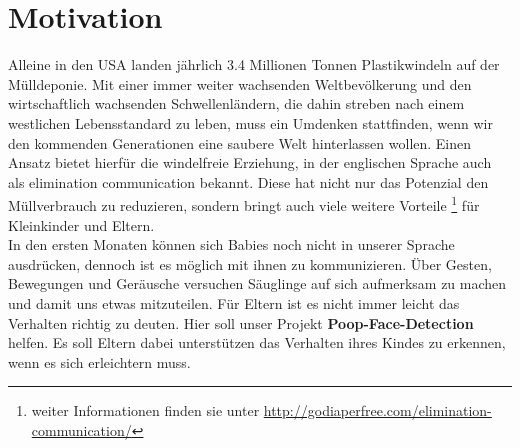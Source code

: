 \section{Motivation}
\label{sec:Motivation}
Alleine in den USA landen jährlich 3.4 Millionen Tonnen Plastikwindeln auf der Mülldeponie. Mit einer immer weiter wachsenden Weltbevölkerung und den wirtschaftlich wachsenden Schwellenländern, die dahin streben nach einem westlichen Lebensstandard zu leben,
muss ein Umdenken stattfinden, wenn wir den kommenden Generationen eine saubere Welt hinterlassen wollen. Einen Ansatz bietet hierfür die \glqq{}windelfreie Erziehung\grqq{}, in der englischen Sprache auch als \glqq{}elimination communication\grqq{} bekannt. Diese hat nicht nur das Potenzial den Müllverbrauch zu reduzieren, sondern bringt auch viele weitere Vorteile \footnote{ weiter Informationen finden sie unter \url{http://godiaperfree.com/elimination-communication/} } für Kleinkinder und Eltern. \\

In den ersten Monaten können sich Babies noch nicht in unserer Sprache ausdrücken, dennoch ist es möglich mit ihnen zu kommunizieren. Über Gesten, Bewegungen und Geräusche versuchen Säuglinge auf sich aufmerksam zu machen und damit uns etwas mitzuteilen. Für Eltern ist es nicht immer leicht das Verhalten richtig zu deuten. Hier soll unser Projekt \textbf{Poop-Face-Detection} helfen. Es soll Eltern dabei unterstützen das Verhalten ihres Kindes zu erkennen, wenn es sich erleichtern muss.
